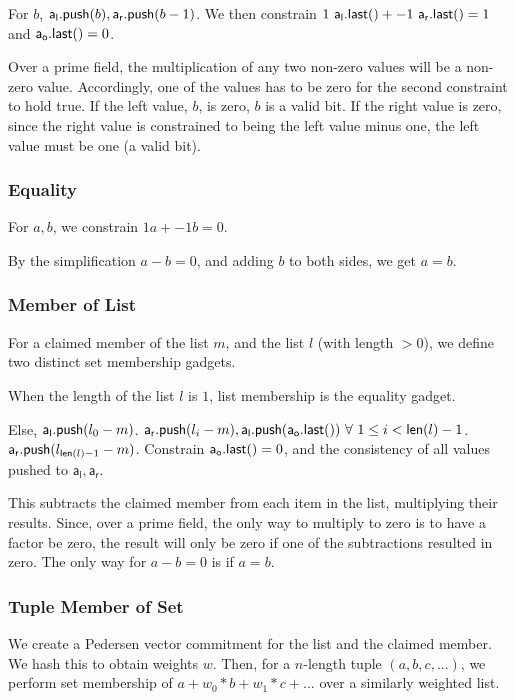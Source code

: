 \documentclass[]{article}
\begin{document}
For $b$, $\mathsf{a_l.push}(b), \mathsf{a_r.push}(b - 1)$. We then constrain $1 ~\mathsf{a_l.last()} + -1 ~\mathsf{a_r.last()} = 1$ and $\mathsf{a_o.last()} = 0$.

Over a prime field, the multiplication of any two non-zero values will be a non-zero value. Accordingly, one of the values has to be zero for the second constraint to hold true. If the left value, $b$, is zero, $b$ is a valid bit. If the right value is zero, since the right value is constrained to being the left value minus one, the left value must be one (a valid bit).

\subsubsection{Equality}

For $a, b$, we constrain $1 a + -1 b = 0$.

By the simplification $a - b = 0$, and adding $b$ to both sides, we get $a = b$.

\subsubsection{Member of List}

For a claimed member of the list $m$, and the list $l$ (with length $> 0$), we define two distinct set membership gadgets.

When the length of the list $l$ is $1$, list membership is the equality gadget.

Else, $\mathsf{a_l.push}(l_0 - m)$. $\mathsf{a_r.push}(l_i - m), \mathsf{a_l.push}(\mathsf{a_o.last()}) ~\forall~ 1 \le i < \mathsf{len}(l) - 1$. $\mathsf{a_r.push}(l_{\mathsf{len}(l) - 1} - m)$. Constrain $\mathsf{a_o.last()} = 0$, and the consistency of all values pushed to $\mathsf{a_l}, \mathsf{a_r}$.

This subtracts the claimed member from each item in the list, multiplying their results. Since, over a prime field, the only way to multiply to zero is to have a factor be zero, the result will only be zero if one of the subtractions resulted in zero. The only way for $a - b = 0$ is if $a = b$.

\subsubsection{Tuple Member of Set}

We create a Pedersen vector commitment for the list and the claimed member. We hash this to obtain weights $w$. Then, for a $n$-length tuple $(a, b, c, ...)$, we perform set membership of $a + w_0 * b + w_1 * c + ...$ over a similarly weighted list.
\end{document}
